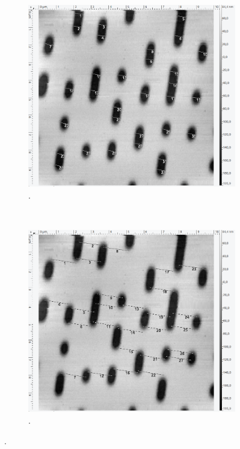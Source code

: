 \begin{figure}[H]
\centering
	\begin{subfigure}[t]{0.4\textwidth}
	\includegraphics[width=\textwidth]{AFM_auswertung/cd_breite.png}
	\caption{.}
	\label{abb:}
	\end{subfigure}
	~
	\begin{subfigure}[t]{0.4\textwidth}
	\includegraphics[width=\textwidth]{AFM_auswertung/cd_abstand.png}
	\caption{.}

\end{subfigure}
\end{figure}

